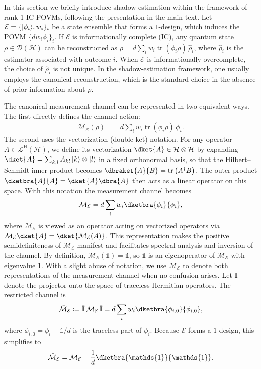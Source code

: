 \documentclass[aps,pra,twocolumn,nofootinbib,superscriptaddress,10pt]{revtex4-2}
\DeclarePairedDelimiter{\ket}{\lvert}{\rangle}
\newcommand{\dproj}[1]{\dketbra{#1}{#1}}
\DeclareMathOperator{\tr}{tr}
\newcommand{\bfI}{\mathbf{I}}
\newcommand{\bbone}{\mathds{1}}
\newcommand{\caD}{\mathcal{D}}
\newcommand{\caE}{\mathcal{E}}
\newcommand{\caH}{\mathcal{H}}
\newcommand{\caL}{\mathcal{L}}
\newcommand{\caM}{\mathcal{M}}
\newcommand{\rmH}{\mathrm{H}}
\newcommand{\bbfI}{\bar{\bfI}}
\newcommand{\bcaM}{\bar{\mathcal{M}}}
\begin{document}
In this section we briefly introduce shadow estimation within the framework of rank-1 IC POVMs, following the presentation in the main text.
Let $\caE = \{\ket{\phi_i}, w_i\}_i$ be a state ensemble that forms a $1$-design, which induces the POVM $\{ d w_i \phi_i \}_i$. If $\caE$ is informationally complete (IC), any quantum state $\rho \in \caD(\caH)$ can be reconstructed as $\rho = d \sum_i w_i \tr(\phi_i \rho)\, \hat{\rho}_i$, where $\hat{\rho}_i$ is the estimator associated with outcome $i$. When $\caE$ is informationally overcomplete, the choice of $\hat{\rho}_i$ is not unique. In the shadow-estimation framework, one usually employs the canonical reconstruction, which is the standard choice in the absence of prior information about $\rho$.


The canonical measurement channel can be represented in two equivalent ways. The first directly defines the channel action:
\begin{align}
\caM_\caE(\rho) &= d \sum_i w_i \tr(\phi_i \rho)\, \phi_i. \label{eq:FD1}
\end{align}
The second uses the vectorization (double-ket) notation. For any operator $A \in \caL^{\rmH}(\caH)$, we define its vectorization $\dket{A} \in \caH \otimes \caH$ by expanding $\dket{A} = \sum_{k,l} A_{kl}\, \ket{k}\otimes\ket{l}$ in a fixed orthonormal basis, so that the Hilbert--Schmidt inner product becomes $\dbraket{A}{B}=\tr\left(A^\dagger B\right)$. The outer product $\dproj{A} = \dket{A}\dbra{A}$ then acts as a linear operator on this space. With this notation the measurement channel becomes
\begin{align}
\caM_\caE = d \sum_i w_i \dproj{\phi_i}, \label{eq:FD2}
\end{align}
where $\caM_\caE$ is viewed as an operator acting on vectorized operators via $\caM_\caE\dket{A} = \dket{\caM_\caE(A)}$. This representation makes the positive semidefiniteness of $\caM_\caE$ manifest and facilitates spectral analysis and inversion of the channel.
By definition, $\caM_\caE(\bbone) = \bbone$, so $\bbone$ is an eigenoperator of $\caM_\caE$ with eigenvalue $1$. With a slight abuse of notation, we use $\caM_\caE$ to denote both representations of the measurement channel when no confusion arises. 
Let $\bbfI$ denote the projector onto the space of traceless Hermitian operators. The restricted channel is
\begin{align}
    \bcaM_\caE \coloneqq \bbfI\, \caM_\caE\, \bbfI = d \sum_i w_i \dproj{\phi_{i,0}},
\end{align}
where $\phi_{i,0} = \phi_i - \bbone/d$ is the traceless part of $\phi_i$. Because $\caE$ forms a $1$-design, this simplifies to
\begin{align}
    \bcaM_\caE = \caM_\caE - \frac{1}{d}\dproj{\bbone}.
\end{align}
\end{document}
